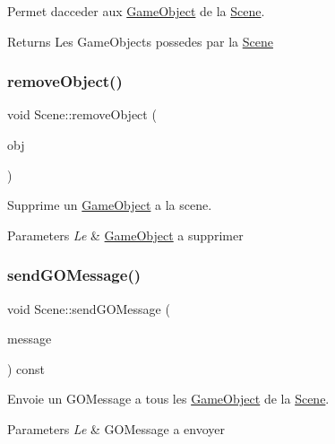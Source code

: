 Permet d\textquotesingle{}acceder aux \hyperlink{class_game_object}{Game\+Object} de la \hyperlink{class_scene}{Scene}. 

\begin{DoxyReturn}{Returns}
Les Game\+Objects possedes par la \hyperlink{class_scene}{Scene} 
\end{DoxyReturn}
\hypertarget{class_scene_a9058ae3eed897e4e18f977abfd53e348}{}\label{class_scene_a9058ae3eed897e4e18f977abfd53e348} 
\subsubsection{\texorpdfstring{remove\+Object()}{removeObject()}}
{\footnotesize\ttfamily void Scene\+::remove\+Object (\begin{DoxyParamCaption}\item[{\hyperlink{class_game_object}{Game\+Object} $\ast$}]{obj }\end{DoxyParamCaption})}



Supprime un \hyperlink{class_game_object}{Game\+Object} a la scene. 


\begin{DoxyParams}{Parameters}
{\em Le} & \hyperlink{class_game_object}{Game\+Object} a supprimer \\
\hline
\end{DoxyParams}
\hypertarget{class_scene_a75722f5960b037b0ec6d9cdf04ff9fa1}{}\label{class_scene_a75722f5960b037b0ec6d9cdf04ff9fa1} 
\subsubsection{\texorpdfstring{send\+G\+O\+Message()}{sendGOMessage()}}
{\footnotesize\ttfamily void Scene\+::send\+G\+O\+Message (\begin{DoxyParamCaption}\item[{const G\+O\+Message}]{message }\end{DoxyParamCaption}) const}



Envoie un G\+O\+Message a tous les \hyperlink{class_game_object}{Game\+Object} de la \hyperlink{class_scene}{Scene}. 


\begin{DoxyParams}{Parameters}
{\em Le} & G\+O\+Message a envoyer \\
\hline
\end{DoxyParams}


